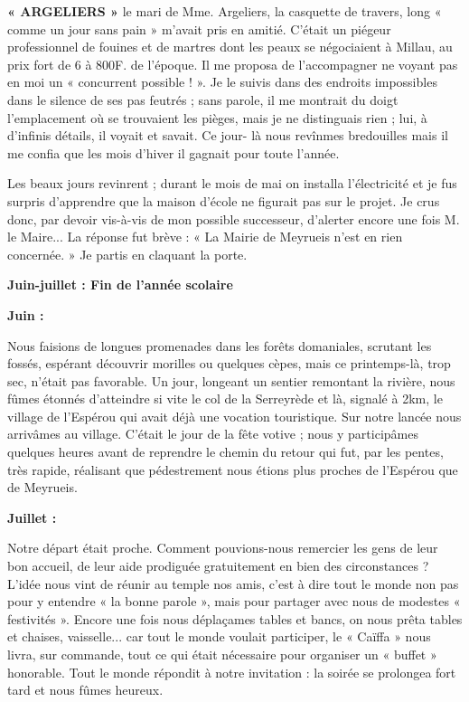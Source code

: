 
\textbf{« ARGELIERS »} le mari de Mme. Argeliers, la casquette de travers, long « comme
un jour sans pain » m’avait pris en amitié. C’était un piégeur professionnel de fouines
et de martres dont les peaux se négociaient à Millau, au prix fort de 6 à 800F. de
l’époque. Il me proposa de l’accompagner ne voyant pas en moi un « concurrent
possible ! ». Je le suivis dans des endroits impossibles dans le silence de ses pas
feutrés ; sans parole, il me montrait du doigt l’emplacement où se trouvaient les
pièges, mais je ne distinguais rien ; lui, à d’infinis détails, il voyait et savait. Ce jour-
là nous revînmes bredouilles mais il me confia que les mois d’hiver il gagnait pour
toute l’année.

Les beaux jours revinrent ; durant le mois de mai on installa l’électricité et je fus
surpris d’apprendre que la maison d’école ne figurait pas sur le projet. Je crus donc,
par devoir vis-à-vis de mon possible successeur, d’alerter encore une fois M. le
Maire... La réponse fut brève : « La Mairie de Meyrueis n’est en rien concernée. » Je
partis en claquant la porte.

\begin{center}
\textbf{Juin-juillet : Fin de l’année scolaire}
\end{center}

\textbf{Juin :}

Nous faisions de longues promenades dans les forêts domaniales, scrutant les fossés,
espérant découvrir morilles ou quelques cèpes, mais ce printemps-là, trop sec, n’était
pas favorable. Un jour, longeant un sentier remontant la rivière, nous fûmes étonnés
d’atteindre si vite le col de la Serreyrède et là, signalé à 2km, le village de l’Espérou
qui avait déjà une vocation touristique. Sur notre lancée nous arrivâmes au village.
C’était le jour de la fête votive ; nous y participâmes quelques heures avant de
reprendre le chemin du retour qui fut, par les pentes, très rapide, réalisant que
pédestrement nous étions plus proches de l’Espérou que de Meyrueis.

\textbf{Juillet :}

Notre départ était proche. Comment pouvions-nous remercier les gens de leur bon
accueil, de leur aide prodiguée gratuitement en bien des circonstances ?
L’idée nous vint de réunir au temple nos amis, c’est à dire tout le monde non pas pour
y entendre « la bonne parole », mais pour partager avec nous de modestes
« festivités ». Encore une fois nous déplaçames tables et bancs, on nous prêta tables et
chaises, vaisselle... car tout le monde voulait participer, le « Caïffa » nous livra, sur
commande, tout ce qui était nécessaire pour organiser un « buffet » honorable. Tout le
monde répondit à notre invitation : la soirée se prolongea fort tard et nous fûmes
heureux.
